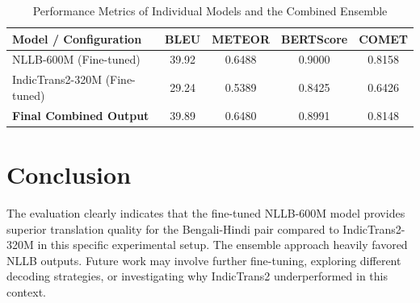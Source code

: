 \documentclass[12pt,a4paper]{report}
\begin{document}
\begin{table}[htpb]
    \centering
    \caption{Performance Metrics of Individual Models and the Combined Ensemble}
    \label{tab:results}
    \begin{tabular}{lcccc}
        \toprule
        \textbf{Model / Configuration} & \textbf{BLEU} & \textbf{METEOR} & \textbf{BERTScore} & \textbf{COMET} \\
        \midrule
        NLLB-600M (Fine-tuned) & 39.92 & 0.6488 & 0.9000 & 0.8158 \\
        IndicTrans2-320M (Fine-tuned) & 29.24 & 0.5389 & 0.8425 & 0.6426 \\
        \midrule
        \textbf{Final Combined Output} & 39.89 & 0.6480 & 0.8991 & 0.8148 \\
        \bottomrule
    \end{tabular}
\end{table}

\chapter{Conclusion}
The evaluation clearly indicates that the fine-tuned NLLB-600M model provides superior translation quality for the Bengali-Hindi pair compared to IndicTrans2-320M in this specific experimental setup. The ensemble approach heavily favored NLLB outputs. Future work may involve further fine-tuning, exploring different decoding strategies, or investigating why IndicTrans2 underperformed in this context.
\end{document}
